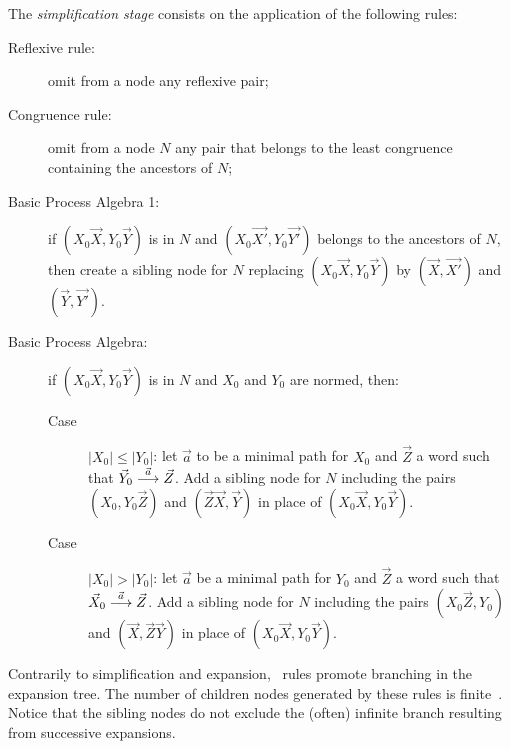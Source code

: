 The \emph{simplification stage} consists on the application of the
following rules:
%
\begin{description}
\item[Reflexive rule:] omit from a node any reflexive pair;
\item[Congruence rule:] omit from a node $N$ any pair that belongs to
  the least congruence containing the ancestors of $N$;
\item[Basic Process Algebra 1:] if $(X_0 \vec X, Y_0 \vec Y)$ is in
  $N$ and $(X_0 \vec {X'}, Y_0 \vec {Y'})$ belongs to the ancestors of
  $N$, then create a sibling node for $N$ replacing
  $(X_0 \vec X, Y_0 \vec Y)$ by $(\vec X, \vec {X'})$ and
  $(\vec Y, \vec {Y'})$.
\item[Basic Process Algebra:] if $(X_0 \vec X, Y_0 \vec Y)$ is in $N$
  and $X_0$ and $Y_0$ are normed, then:
  \begin{description}
  \item[Case] $|X_0| \leq |Y_0|$: let $\vec a$ to be a minimal path
    for $X_0$ and $\vec Z$ a word such that
    $\vec Y_0 \LTSderives[\vec a] \vec Z$. Add a sibling node for
    $N$ including the pairs $(X_0, Y_0 \vec Z)$ and
    $(\vec Z \vec X, \vec Y)$ in place of $(X_0 \vec X, Y_0 \vec Y)$.
  \item[Case] $|X_0| > |Y_0|$: let $\vec a$ be a minimal path for
    $Y_0$ and $\vec Z$ a word such that $\vec X_0 \LTSderives[\vec a] \vec
    Z$. Add a sibling node for $N$ including the pairs
    $(X_0 \vec Z, Y_0 )$ and $(\vec X, \vec Z \vec Y)$ in place of
    $(X_0 \vec X, Y_0 \vec Y)$.
  \end{description}
\end{description}

Contrarily to simplification and expansion, \BPA\ rules promote
branching in the expansion tree. The number of children nodes
generated by these rules is
finite~\cite{DBLP:journals/iandc/ChristensenHS95}.
%
Notice that the sibling nodes do not exclude the (often) infinite
branch resulting from successive expansions.

